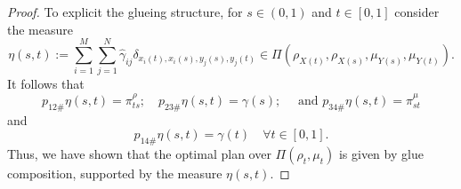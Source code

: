 \documentclass[11pt, oneside, titlepage]{book}
\theoremstyle{plain}
\theoremstyle{definition}
\begin{document}
\begin{proof}
To explicit the glueing structure, for $s \in (0, 1)$ and $t \in [0, 1]$ consider the measure
\begin{equation}
\label{eq: G(s, t) definition glueing measure}
    \eta(s,t) := \sum_{i=1}^M \sum_{j = 1}^N \hat\gamma_{ij} \delta_{x_i(t), x_i(s), y_j(s), y_j(t)} \in \Pi(\rho_{X(t)}, \rho_{X(s)}, \mu_{Y(s)}, \mu_{Y(t)}).
\end{equation}
It follows that
\begin{equation*}
    p_{12\#}\eta(s, t) = \pi^\rho_{ts};\quad p_{23\#} \eta(s, t) = \gamma(s); \quad \text{ and } p_{34\#} \eta(s, t) = \pi^\mu_{st}
\end{equation*}
and
\begin{equation*}
    p_{14\#} \eta(s, t) = \gamma(t) \quad\forall t \in [0, 1].
\end{equation*}
Thus, we have shown that the optimal plan over $\Pi(\rho_t, \mu_t)$ is given by glue composition, supported by the measure $\eta(s, t)$.
\end{proof}
\end{document}
